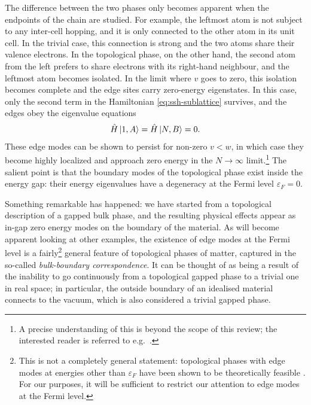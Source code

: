 The difference between the two phases only becomes apparent when the endpoints of the chain are studied. %
For example, the leftmost atom is not subject to any inter-cell hopping, and it is only connected to the other atom in its unit cell. In the trivial case, this connection is strong and the two atoms share their valence electrons. In the topological phase, on the other hand, the second atom from the left prefers to share electrons with its right-hand neighbour, and the leftmost atom becomes isolated. In the limit where $v$ goes to zero, this isolation becomes complete and the edge sites carry zero-energy eigenstates. In this case, only the second term in the Hamiltonian \eqref{eq:ssh-sublattice} survives, and the edges obey the eigenvalue equations
\begin{align*}
	\hat{H}\ket{1,A} = \hat{H}\ket{N,B} = 0.
\end{align*}
These edge modes can be shown to persist for non-zero $v<w$, in which case they become highly localized and approach zero energy in the $N\to\infty$ limit.\footnote{
	A precise understanding of this is beyond the scope of this review; the interested reader is referred to e.g.\ \cite{Asboth_topo-course}.}
The salient point is that the boundary modes of the topological phase exist inside the energy gap: their energy eigenvalues have a degeneracy at the Fermi level $\varepsilon_F = 0$. 

Something remarkable has happened: we have started from a topological description of a gapped bulk phase, and the resulting physical effects appear as in-gap zero energy modes on the boundary of the material. As will become apparent looking at other examples, the existence of edge modes at the Fermi level is a fairly\footnote{
	This is not a completely general statement: topological phases with edge modes at energies other than $\varepsilon_F$ have been shown to be theoretically feasible \cite{Freedman_gapped-edge}. For our purposes, it will be sufficient to restrict our attention to edge modes at the Fermi level.}
general feature of topological phases of matter, captured in the so-called \emph{bulk-boundary correspondence}. It can be thought of as being a result of the inability to go continuously from a topological gapped phase to a trivial one in real space; in particular, the outside boundary of an idealised material connects to the vacuum, which is also considered a trivial gapped phase.

